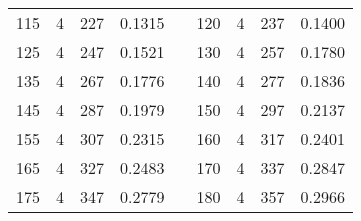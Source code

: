 \documentclass[a4paper, 12pt, french,oneside]{book}
\begin{document}
\begin{table}[!ht]
\begin{tabularx}{\linewidth}{|c|c|c|c|X|c|c|c|c|}
        115          & 4            & 227             & 0.1315                        &  &

        120          & 4            & 237             & 0.1400                                                                                                           \\

        125          & 4            & 247             & 0.1521                        &  &

        130          & 4            & 257             & 0.1780                                                                                                           \\

        135          & 4            & 267             & 0.1776                        &  &

        140          & 4            & 277             & 0.1836                                                                                                           \\

        145          & 4            & 287             & 0.1979                        &  &

        150          & 4            & 297             & 0.2137                                                                                                           \\

        155          & 4            & 307             & 0.2315                        &  &

        160          & 4            & 317             & 0.2401                                                                                                           \\

        165          & 4            & 327             & 0.2483                        &  &

        170          & 4            & 337             & 0.2847                                                                                                           \\

        175          & 4            & 347             & 0.2779                        &  &

        180          & 4            & 357             & 0.2966                                                                                                           \\


\end{tabularx}
\end{table}
\end{document}

